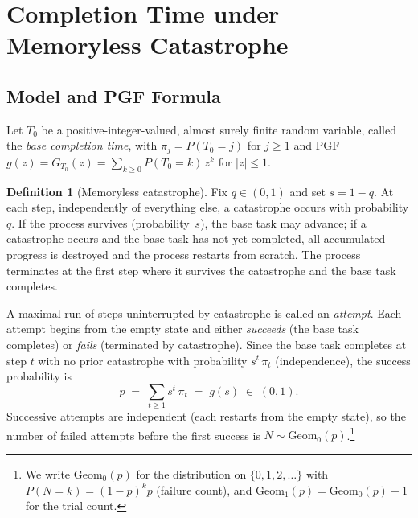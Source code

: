 \documentclass[11pt]{article}
\theoremstyle{plain}
\theoremstyle{definition}
\newtheorem{definition}[theorem]{Definition}
\theoremstyle{remark}
\begin{document}
\section{Completion Time under Memoryless Catastrophe}\label{sec:completion}



\subsection{Model and PGF Formula}\label{sec:attempt}\label{sec:model}

Let $T_0$ be a positive-integer-valued, almost surely finite random variable, called the \emph{base completion time}, with $\pi_j = P(T_0 = j)$ for $j \geq 1$ and PGF $g(z) = G_{T_0}(z) = \sum_{k \geq 0} P(T_0=k)\, z^k$ for $|z| \leq 1$.

\begin{definition}[Memoryless catastrophe]\label{def:memoryless}
Fix $q \in (0,1)$ and set $s = 1-q$.  At each step, independently of everything else, a catastrophe occurs with probability $q$.  If the process survives (probability~$s$), the base task may advance; if a catastrophe occurs and the base task has not yet completed, all accumulated progress is destroyed and the process restarts from scratch.  The process terminates at the first step where it survives the catastrophe and the base task completes.
\end{definition}

A maximal run of steps uninterrupted by catastrophe is called an \emph{attempt}.  Each attempt begins from the empty state and either \emph{succeeds} (the base task completes) or \emph{fails} (terminated by catastrophe).  Since the base task completes at step $t$ with no prior catastrophe with probability $s^t\,\pi_t$ (independence), the success probability is\label{lem:success}
\begin{equation}\label{eq:p}
  p \;=\; \sum_{t \geq 1} s^t\, \pi_t \;=\; g(s) \;\in\; (0,1).
\end{equation}
Successive attempts are independent (each restarts from the empty state), so the number of failed attempts before the first success is $N \sim \mathrm{Geom}_0(p)$.\footnote{We write $\mathrm{Geom}_0(p)$ for the distribution on $\{0,1,2,\ldots\}$ with $P(N=k)=(1-p)^k p$ (failure count), and $\mathrm{Geom}_1(p) = \mathrm{Geom}_0(p)+1$ for the trial count.}\label{def:geom}
\end{document}
